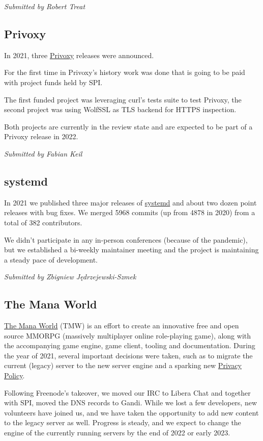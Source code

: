 \documentclass[a4paper]{report}
\begin{document}
{\em Submitted by Robert Treat}

\subsection{Privoxy}

In 2021, three \href{https://www.privoxy.org/}{Privoxy} releases were announced.

For the first time in Privoxy's history work was done that is going to be paid with project funds held by SPI.

The first funded project was leveraging curl's tests suite to test Privoxy, the second project was using WolfSSL as TLS backend for HTTPS inspection.

Both projects are currently in the review state and are expected to be part of a Privoxy release in 2022.

{\em Submitted by Fabian Keil}

\subsection{systemd}

In 2021 we published three major releases of \href{https://systemd.io/}{systemd} and about two dozen point releases with bug fixes. We merged 5968 commits (up from 4878 in 2020) from a total of 382 contributors.

We didn't participate in any in-person conferences (because of the pandemic), but we established a bi-weekly maintainer meeting and the project is maintaining a steady pace of development.

{\em Submitted by Zbigniew Jędrzejewski-Szmek}

\subsection{The Mana World}

\href{https://www.themanaworld.org/about}{The Mana World} (TMW) is an effort to create an innovative free and open source MMORPG (massively multiplayer online role-playing game), along with the accompanying game engine, game client, tooling and documentation. During the year of 2021, several important decisions were taken, such as to migrate the current (legacy) server to the new server engine and a sparking new \href{https://policies.themanaworld.org/privacy-policy}{Privacy Policy}.

Following Freenode's takeover, we moved our IRC to Libera Chat and together with SPI, moved the DNS records to Gandi. While we lost a few developers, new volunteers have joined us, and we have taken the opportunity to add new content to the legacy server as well. Progress is steady, and we expect to change the engine of the currently running servers by the end of 2022 or early 2023.
\end{document}
